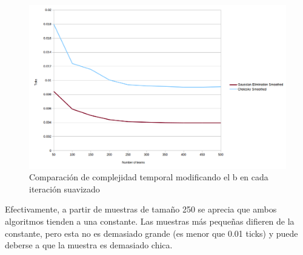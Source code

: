 \begin{figure}[h!]
  \begin{center}
	\includegraphics[scale=0.50]{imagenes/cuantitative/bChange/ColleyMatrixCuantitativeBChangeAnalysisConstant.png}
	\caption{Comparaci\'on de complejidad temporal modificando el b en cada iteraci\'on suavizado}
	\label{bChangeSmoothed}
  \end{center}
\end{figure}

Efectivamente, a partir de muestras de tama\~no 250 se aprecia que ambos algoritmos tienden a una constante. Las muestras m\'as peque\~nas difieren de la constante, pero esta no es demasiado grande (es menor que 0.01 ticks) y puede deberse a que la muestra es demasiado chica.

